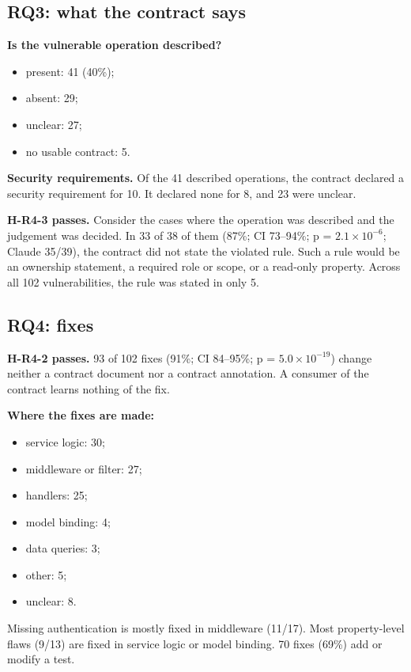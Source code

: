 \documentclass[conference]{IEEEtran}
\begin{document}
\subsection{RQ3: what the contract says}
\textbf{Is the vulnerable operation described?}
\begin{itemize}
\item present: 41 (40\%);
\item absent: 29;
\item unclear: 27;
\item no usable contract: 5.
\end{itemize}

\textbf{Security requirements.} Of the 41 described operations, the contract declared a security requirement for 10. It declared none for 8, and 23 were unclear.

\textbf{H-R4-3 passes.} Consider the cases where the operation was described and the judgement was decided. In 33 of 38 of them (87\%; CI 73--94\%; p = $2.1 \times 10^{-6}$; Claude 35/39), the contract did not state the violated rule. Such a rule would be an ownership statement, a required role or scope, or a read-only property. Across all 102 vulnerabilities, the rule was stated in only 5.

\subsection{RQ4: fixes}
\textbf{H-R4-2 passes.} 93 of 102 fixes (91\%; CI 84--95\%; p = $5.0 \times 10^{-19}$) change neither a contract document nor a contract annotation. A consumer of the contract learns nothing of the fix.

\textbf{Where the fixes are made:}
\begin{itemize}
\item service logic: 30;
\item middleware or filter: 27;
\item handlers: 25;
\item model binding: 4;
\item data queries: 3;
\item other: 5;
\item unclear: 8.
\end{itemize}

Missing authentication is mostly fixed in middleware (11/17). Most property-level flaws (9/13) are fixed in service logic or model binding. 70 fixes (69\%) add or modify a test.
\end{document}
